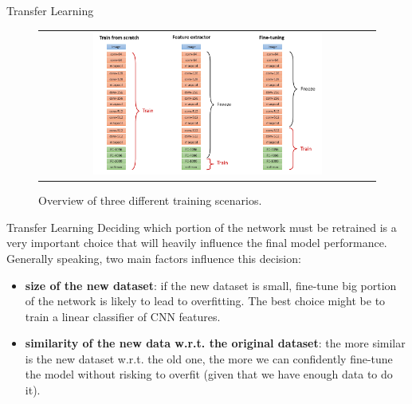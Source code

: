 \documentclass[aspectratio=169]{beamer}
\begin{document}

\begin{frame}{Transfer Learning}
\begin{figure}
\begin{tabular}{c}
\includegraphics[width=0.7\textwidth]{img/cnn/training_possibilities.png}
\end{tabular}
\caption{Overview of three different training scenarios.}
\end{figure}
\end{frame}


\begin{frame}{Transfer Learning}
Deciding which portion of the network must be retrained is a very important choice that will heavily influence the final model performance.\\
\vspace{0.5cm}
Generally speaking, two main factors influence this decision:
\begin{itemize}
\item \textbf{size of the new dataset}: if the new dataset is small, fine-tune big portion of the network is likely to lead to overfitting. The best choice might be to train a linear classifier of CNN features.
\item \textbf{similarity of the new data w.r.t. the original dataset}: the more similar is the new dataset w.r.t. the old one, the more we can confidently fine-tune the model without risking to overfit (given that we have enough data to do it).
\end{itemize}
\end{frame}

\end{document}
